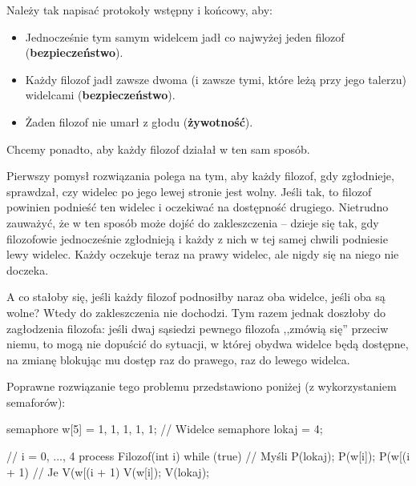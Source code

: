 Należy tak napisać protokoły wstępny i końcowy, aby:
\begin{itemize}
    \item Jednocześnie tym samym widelcem jadł co najwyżej jeden filozof (\textbf{bezpieczeństwo}).
    \item Każdy filozof jadł zawsze dwoma (i zawsze tymi, które leżą przy jego talerzu) widelcami (\textbf{bezpieczeństwo}).
    \item Żaden filozof nie umarł z głodu (\textbf{żywotność}).
\end{itemize}

Chcemy ponadto, aby każdy filozof działał w ten sam sposób.

Pierwszy pomysł rozwiązania polega na tym, aby każdy filozof, gdy zgłodnieje, sprawdzał, czy widelec po jego lewej stronie jest wolny. Jeśli tak, to filozof powinien podnieść ten widelec i oczekiwać na dostępność drugiego. Nietrudno zauważyć, że w ten sposób może dojść do zakleszczenia -- dzieje się tak, gdy filozofowie jednocześnie zgłodnieją i każdy z nich w tej samej chwili podniesie lewy widelec. Każdy oczekuje teraz na prawy widelec, ale nigdy się na niego nie doczeka.

A co stałoby się, jeśli każdy filozof podnosiłby naraz oba widelce, jeśli oba są wolne? Wtedy do zakleszczenia nie dochodzi. Tym razem jednak doszłoby do zagłodzenia filozofa: jeśli dwaj sąsiedzi pewnego filozofa ,,zmówią się'' przeciw niemu, to mogą nie dopuścić do sytuacji, w której obydwa widelce będą dostępne, na zmianę blokując mu dostęp raz do prawego, raz do lewego widelca.

Poprawne rozwiązanie tego problemu przedstawiono poniżej (z wykorzystaniem semaforów):
\begin{java}
    semaphore w[5] = {1, 1, 1, 1, 1}; // Widelce
    semaphore lokaj = 4;

    // i = 0, ..., 4
    process Filozof(int i) {
        while (true) {
            // Myśli
            P(lokaj);
            P(w[i]);
            P(w[(i + 1) %
            // Je
            V(w[(i + 1) %
            V(w[i]);
            V(lokaj);
        }
    }
\end{java}

